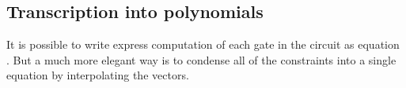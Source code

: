 



\subsection{Transcription into polynomials}
It is possible to write express computation of each gate in the circuit as equation . But a much more elegant way is to condense all of the constraints into a single equation by interpolating the vectors.

